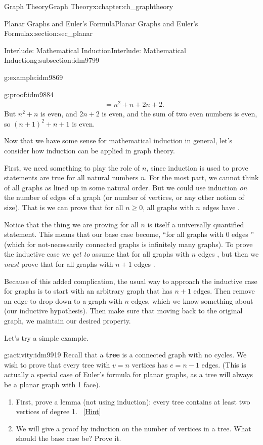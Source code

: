 \documentclass[oneside,10pt,]{book}
\newcommand{\terminology}[1]{\textbf{#1}}
\numberwithin{equation}{chapter}
\newcommand{\amp}{&}
\begin{document}
\begin{chapterptx}{Graph Theory}{}{Graph Theory}{}{}{x:chapter:ch_graphtheory}
\begin{sectionptx}{Planar Graphs and Euler's Formula}{}{Planar Graphs and Euler's Formula}{}{}{x:section:sec_planar}
\begin{subsectionptx}{Interlude: Mathematical Induction}{}{Interlude: Mathematical Induction}{}{}{g:subsection:idm9799}
\begin{example}{}{g:example:idm9869}
\begin{proofptx}{}{g:proof:idm9884}
\begin{align*}
\amp = n^2 + n + 2n + 2.
\end{align*}
But \(n^2 + n\) is even, and \(2n + 2\) is even, and the sum of two even numbers is even, so \((n+1)^2 + n+1\) is even.%
\end{proofptx}
\end{example}
Now that we have some sense for mathematical induction in general, let's consider how induction can be applied in graph theory.%
\par
First, we need something to play the role of \(n\), since induction is used to prove statements are true for all natural numbers \(n\).  For the most part, we cannot think of all graphs as lined up in some natural order.  But we could use induction \emph{on} the number of edges of a graph (or number of vertices, or any other notion of size).  That is we can prove that for all \(n\ge 0\), all graphs with \(n\) edges have \textellipsis{}.%
\par
Notice that the thing we are proving for all \(n\) is itself a universally quantified statement. This means that our base case become, ``for all graphs with 0 edges \textellipsis{}'' (which for not-necessarily connected graphs is infinitely many graphs).  To prove the inductive case we \emph{get to} assume that for all graphs with \(n\) edges \textellipsis{}, but then we \emph{must} prove that for all graphs with \(n+1\) edges \textellipsis{}.%
\par
Because of this added complication, the usual way to approach the inductive case for graphs is to start with an arbitrary graph that has \(n+1\) edges.  Then remove an edge to drop down to a graph with \(n\) edges, which we know something about (our inductive hypothesis).  Then make sure that moving back to the original graph, we maintain our desired property.%
\par
Let's try a simple example.%
\begin{activity}{}{g:activity:idm9919}%
Recall that a \terminology{tree} is a connected graph with no cycles.  We wish to prove that every tree with \(v = n\) vertices has \(e = n-1\) edges.  (This is actually a special case of Euler's formula for planar graphs, as a tree will always be a planar graph with 1 face).%
\begin{enumerate}[font=\bfseries,label=(\alph*),ref=\alph*]
\item{}First, prove a lemma (not using induction): every tree contains at least two vertices of degree 1.%
\qquad~\hfill{\tiny\hyperlink{g:hint:idm9928-back}{[Hint]}}\item{}We will give a proof by induction on the number of vertices in a tree.  What should the base case be?  Prove it.%

\end{enumerate}
\end{activity}
\end{subsectionptx}
\end{sectionptx}
\end{chapterptx}
\end{document}
